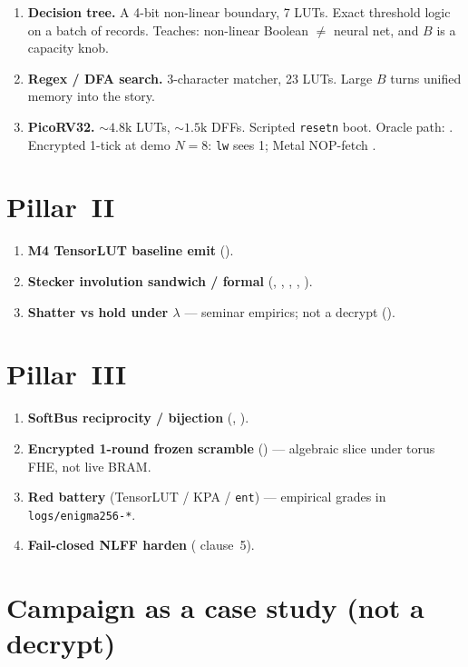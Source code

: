 \begin{enumerate}
  \item \textbf{Decision tree.}
        A 4-bit non-linear boundary, 7 LUTs. Exact threshold logic on a
        batch of records. Teaches: non-linear Boolean $\neq$ neural net,
        and $B$ is a capacity knob.
  \item \textbf{Regex / DFA search.}
        3-character matcher, 23 LUTs. Large $B$ turns unified memory into
        the story.
  \item \textbf{PicoRV32.}
        ${\sim}4.8\mathrm{k}$ LUTs, ${\sim}1.5\mathrm{k}$ DFFs. Scripted
        \texttt{resetn} boot. Oracle path: . Encrypted 1-tick at
        demo $N{=}8$:  \texttt{lw} sees 1; Metal NOP-fetch .
\end{enumerate}

\section{Pillar~II}

\begin{enumerate}
  \item \textbf{M4 TensorLUT baseline emit} ().
  \item \textbf{Stecker involution sandwich / formal} (, ,
        , , ).
  \item \textbf{Shatter vs hold under $\lambda$} --- seminar empirics; not a
        decrypt ().
\end{enumerate}

\section{Pillar~III}

\begin{enumerate}
  \item \textbf{SoftBus reciprocity / bijection} (, ).
  \item \textbf{Encrypted 1-round frozen scramble} () --- algebraic
        slice under torus FHE, not live BRAM.
  \item \textbf{Red battery} (TensorLUT / KPA / \texttt{ent}) --- empirical
        grades in \texttt{logs/enigma256-*}.
  \item \textbf{Fail-closed NLFF harden} ( clause~5).
\end{enumerate}

\section{Campaign as a case study (not a decrypt)}

